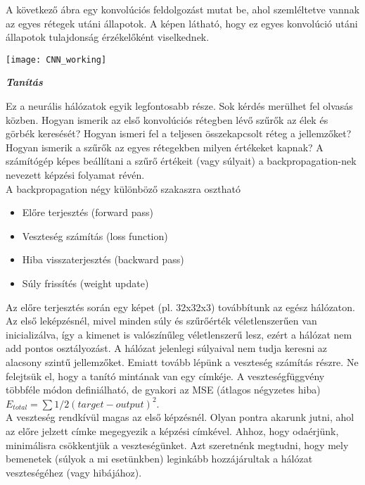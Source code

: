 A következő ábra egy konvolúciós feldolgozást mutat be, ahol szemléltetve vannak az egyes rétegek utáni állapotok. A képen látható, hogy ez egyes konvolúció utáni állapotok tulajdonság érzékelőként viselkednek.\\

\begin{center}
\texttt{[image: CNN\_working]}
\end{center}

\begin{flushleft}
{\Large \textit{\textbf{Tanítás}}}
\end{flushleft}

Ez a neurális hálózatok egyik legfontosabb része. Sok kérdés merülhet fel olvasás közben. Hogyan ismerik az első konvolúciós rétegben lévő szűrők az élek és görbék keresését? Hogyan ismeri fel a teljesen összekapcsolt réteg a jellemzőket? Hogyan ismerik a szűrők az egyes rétegekben milyen értékeket kapnak? A számítógép képes beállítani a szűrő értékeit (vagy súlyait) a backpropagation-nek nevezett képzési folyamat révén.\\

A backpropagation négy különböző szakaszra osztható
\begin{itemize}
\item Előre terjesztés (forward pass)
\item Veszteség számítás (loss function)
\item Hiba visszaterjesztés (backward pass)
\item Súly frissítés (weight update)
\end{itemize}

Az előre terjesztés során egy képet (pl. 32x32x3) továbbítunk az egész hálózaton. Az első leképzésnél, mivel minden súly és szűrőérték véletlenszerűen van inicializálva, így a kimenet is valószínűleg véletlenszerű lesz, ezért a hálózat nem add pontos osztályozást. A hálózat jelenlegi súlyaival nem tudja keresni az alacsony szintű jellemzőket. Emiatt tovább lépünk a veszteség számítás részre. Ne felejtsük el, hogy a tanító mintának van egy címkéje. A veszteségfüggvény többféle módon definiálható, de gyakori az MSE (átlagos négyzetes hiba) \(E_{total} = \sum 1/2(target - output)^2\).\\

A veszteség rendkívül magas az első képzésnél. Olyan pontra akarunk jutni, ahol az előre jelzett címke megegyezik a képzési címkével. Ahhoz, hogy odaérjünk, minimálisra csökkentjük a veszteségünket. Azt szeretnénk megtudni, hogy mely bemenetek (súlyok a mi esetünkben) leginkább hozzájárultak a hálózat veszteségéhez (vagy hibájához).


